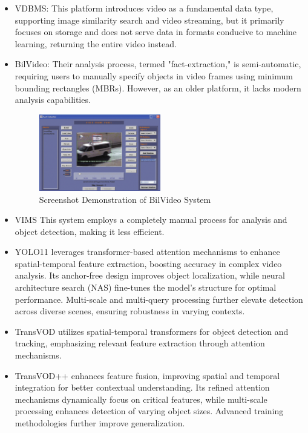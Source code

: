 \documentclass[conference]{IEEEtran}
\begin{document}
\begin{itemize} [itemsep=5pt]
    \item VDBMS\cite{aref2003vdbms}: This platform introduces video as a fundamental data type, supporting image similarity search and video streaming, but it primarily focuses on storage and does not serve data in formats conducive to machine learning, returning the entire video instead.
    \item BilVideo\cite{ozsoyoglu2003bilvideo}: Their analysis process, termed "fact-extraction," is semi-automatic, requiring users to manually specify objects in video frames using minimum bounding rectangles (MBRs). However, as an older platform, it lacks modern analysis capabilities.
    \begin{figure}[h!]
        \centering
        \includegraphics[width=0.5\textwidth]{BilVideo.png}
        \caption{Screenshot Demonstration of BilVideo System}
        \label{fig:bilvideo_demo}
    \end{figure}
    \item VIMS\cite{lee1997vims} This system employs a completely manual process for analysis and object detection, making it less efficient.
    \item YOLO11 \cite{yolo11} leverages transformer-based attention mechanisms to enhance spatial-temporal feature extraction, boosting accuracy in complex video analysis. Its anchor-free design improves object localization, while neural architecture search (NAS) fine-tunes the model’s structure for optimal performance. Multi-scale and multi-query processing further elevate detection across diverse scenes, ensuring robustness in varying contexts.
    \item TransVOD\cite{zhou2022transvod} utilizes spatial-temporal transformers for object detection and tracking, emphasizing relevant feature extraction through attention mechanisms.
    \item TransVOD++\cite{zhou2023transvodplusplus} enhances feature fusion, improving spatial and temporal integration for better contextual understanding. Its refined attention mechanisms dynamically focus on critical features, while multi-scale processing enhances detection of varying object sizes. Advanced training methodologies further improve generalization.

\end{itemize}
\end{document}
